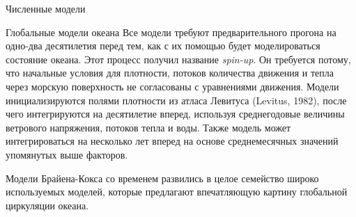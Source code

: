 \begin{chapter}{Численные модели}
\begin{section}{Глобальные модели океана}
Все модели требуют предварительного прогона на одно-два десятилетия перед
тем, как с их помощью будет моделироваться состояние океана. Этот процесс
получил название \emph{spin-up}.
Он требуется потому, что начальные условия для плотности, потоков количества
движения и тепла через морскую поверхность не согласованы с уравнениями
движения. Модели инициализируются полями плотности из атласа 
Левитуса (Levitus, 1982), после чего интегрируются на десятилетие вперед,
используя среднегодовые величины ветрового 
напряжения, потоков 
тепла и воды. Также модель может интегрироваться на 
несколько лет вперед на основе среднемесячных значений упомянутых выше 
факторов.
%

Модели Брайена-Кокса со временем
развились в целое семейство широко используемых моделей, которые предлагают
впечатляющую картину глобальной циркуляции океана.
%


\end{section}
\end{chapter}
